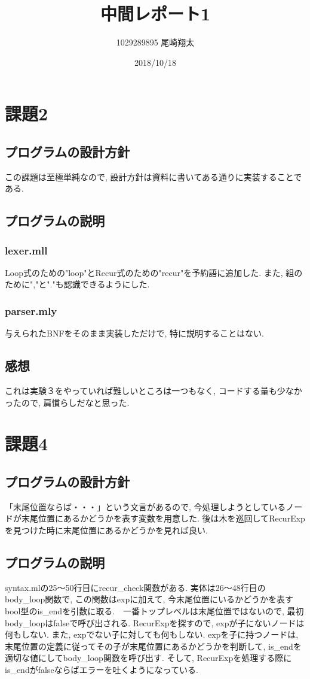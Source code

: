 \documentclass{jarticle}
\begin{document}
\title{中間レポート1}
\author{1029289895 尾崎翔太}
\date{2018/10/18}

\maketitle
\newpage

\section{課題2}
\subsection{プログラムの設計方針}
この課題は至極単純なので, 設計方針は資料に書いてある通りに実装することである.

\subsection{プログラムの説明}
\subsubsection{lexer.mll}
Loop式のための"loop"とRecur式のための"recur"を予約語に追加した. また, 組のために","と"."も認識できるようにした.

\subsubsection{parser.mly}
与えられたBNFをそのまま実装しただけで, 特に説明することはない.

\subsection{感想}
これは実験３をやっていれば難しいところは一つもなく, コードする量も少なかったので, 肩慣らしだなと思った.


\section{課題4}
\subsection{プログラムの設計方針}
「末尾位置ならば・・・」という文言があるので, 今処理しようとしているノードが末尾位置にあるかどうかを表す変数を用意した. 後は木を巡回してRecurExpを見つけた時に末尾位置にあるかどうかを見れば良い.

\subsection{プログラムの説明}
syntax.mlの25〜50行目にrecur\_check関数がある. 実体は26〜48行目のbody\_loop関数で, この関数はexpに加えて, 今末尾位置にいるかどうかを表すbool型のis\_endを引数に取る.　一番トップレベルは末尾位置ではないので, 最初body\_loopはfalseで呼び出される. RecurExpを探すので, expが子にないノードは何もしない. また, expでない子に対しても何もしない. expを子に持つノードは, 末尾位置の定義に従ってその子が末尾位置にあるかどうかを判断して, is\_endを適切な値にしてbody\_loop関数を呼び出す. そして, RecurExpを処理する際にis\_endがfalseならばエラーを吐くようになっている.
\end{document}
